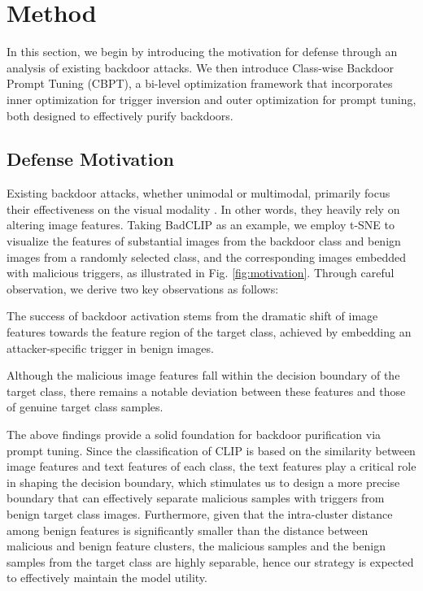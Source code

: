 \section{Method}
\label{method}

In this section, we begin by introducing the motivation for defense through an analysis of existing backdoor attacks. We then introduce Class-wise Backdoor Prompt Tuning (CBPT), a bi-level optimization framework that incorporates inner optimization for trigger inversion and outer optimization for prompt tuning, both designed to effectively purify backdoors.

\subsection{Defense Motivation}
Existing backdoor attacks, whether unimodal or multimodal, primarily focus their effectiveness on the visual modality \cite{gu2019badnets, liang2024badclip}. In other words, they heavily rely on altering image features. Taking BadCLIP \cite{liang2024badclip} as an example, we employ t-SNE \cite{van2008visualizing} to visualize the features of substantial images from the backdoor class and benign images from a randomly selected class, and the corresponding images embedded with malicious triggers, as illustrated in Fig. \ref{fig:motivation}. Through careful observation, we derive two key observations as follows:

 The success of backdoor activation stems from the dramatic shift of image features towards the feature region of the target class, achieved by embedding an attacker-specific trigger in benign images.

 Although the malicious image features fall within the decision boundary of the target class, there remains a notable deviation between these features and those of genuine target class samples.

The above findings provide a solid foundation for backdoor purification via prompt tuning. Since the classification of CLIP is based on the similarity between image features and text features of each class, the text features play a critical role in shaping the decision boundary, which stimulates us to design a more precise boundary that can effectively separate malicious samples with triggers from benign target class images. Furthermore, given that the intra-cluster distance among benign features is significantly smaller than the distance between malicious and benign feature clusters, the malicious samples and the benign samples from the target class are highly separable, hence our strategy is expected to effectively maintain the model utility.


